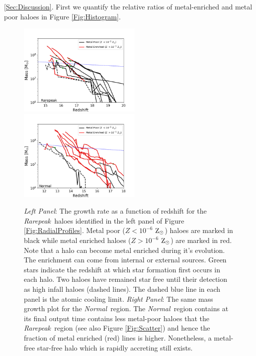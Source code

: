 \documentclass[graphics, twocolumn, usenatbib]{mn2e}
\newcommand{\zsolarc} {$\rm{Z_{\odot}}$}
\newcommand{\rarepeak} {\textit{Rarepeak~}}
\newcommand{\normal} {\textit{Normal~}}
\begin{document}
\ref{Sec:Discussion}. First we quantify the relative ratios of metal-enriched
and metal poor haloes in Figure \ref{Fig:Histogram}.
\begin{figure} 
\centering
\begin{minipage}{175mm}      \begin{center} 
\centerline{
\includegraphics[width=0.525\textwidth]{FIGURES/Rarepeak_MassRedshift.png}
\includegraphics[width=0.525\textwidth]{FIGURES/Normal_MassRedshift.png}}
\caption{\textit{Left Panel}: The growth rate as a function of redshift for the \rarepeak haloes identified in the left
  panel of Figure \ref{Fig:RadialProfiles}. Metal poor ($Z < 10^{-6}$ \zsolarc) haloes are marked in black while
  metal enriched haloes ($Z > 10^{-6}$ \zsolarc) are marked in red. Note that a halo can become metal enriched
  during it's evolution. The enrichment can come from internal or external sources. Green stars indicate the
  redshift at which star formation first occurs in each halo. Two haloes have remained star free until their
  detection as high infall haloes (dashed lines). The dashed blue line in each panel is the atomic cooling limit.
  \textit{Right Panel}: The same mass growth plot for the \normal region. The \normal region contains at its final
  output time contains less metal-poor haloes that the \rarepeak region (see also Figure \ref{Fig:Scatter}) and
  hence the fraction of metal enriched (red) lines is higher. Nonetheless, a metal-free star-free halo which
  is rapidly accreting still exists. 
}\label{Fig:GrowthRates}
\end{center} \end{minipage}

\end{figure}
\end{document}
